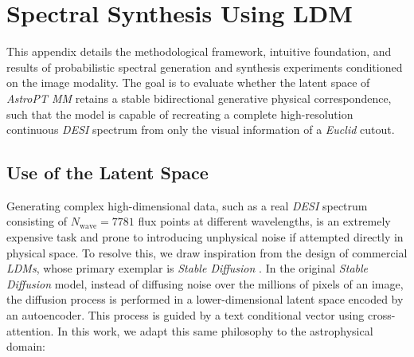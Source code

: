 
\section{Spectral Synthesis Using LDM} \label{sec:ap:diff}

This appendix details the methodological framework, intuitive foundation, and results of probabilistic spectral generation and synthesis experiments conditioned on the image modality. The goal is to evaluate whether the latent space of \textit{AstroPT MM} retains a stable bidirectional generative physical correspondence, such that the model is capable of recreating a complete high-resolution continuous \textit{\gls{DESI}} spectrum from only the visual information of a \textit{Euclid} cutout.

\subsection{Use of the Latent Space}

Generating complex high-dimensional data, such as a real \textit{DESI} spectrum consisting of $N_{\text{wave}} = 7781$ flux points at different wavelengths, is an extremely expensive task and prone to introducing unphysical noise if attempted directly in physical space. To resolve this, we draw inspiration from the design of commercial \textit{\glspl{LDM}}, whose primary exemplar is \textit{Stable Diffusion} \autocite{ar:rombach-2022}. In the original \textit{Stable Diffusion} model, instead of diffusing noise over the millions of pixels of an image, the diffusion process is performed in a lower-dimensional latent space encoded by an autoencoder. This process is guided by a text conditional vector using cross-attention. In this work, we adapt this same philosophy to the astrophysical domain:

